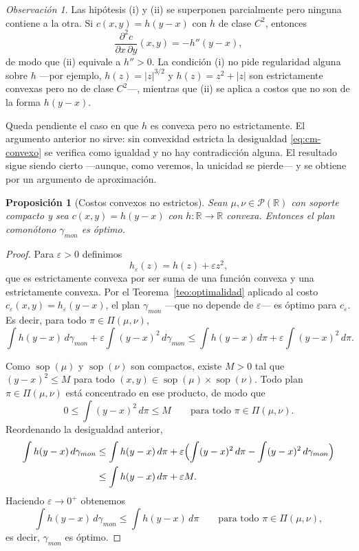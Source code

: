 \documentclass[12pt, a4paper]{amsbook}
\def\sop{\operatorname {\mathrm{sop}}}
\newcommand{\R}{{\mathbb R}}
\newtheorem{prop}[teo]{Proposición}
\theoremstyle{remark}
\newtheorem{obs}[teo]{Observación}
\theoremstyle{definition}
\numberwithin{section}{chapter}
\numberwithin{subsection}{section}
\numberwithin{equation}{section}
\numberwithin{figure}{chapter}
\begin{document}
\begin{obs}
Las hipótesis (i) y (ii) se superponen parcialmente pero ninguna contiene a la otra.
Si $c(x,y)=h(y-x)$ con $h$ de clase $C^2$, entonces
\[
\frac{\partial^2c}{\partial x\,\partial y}(x,y)=-h''(y-x),
\]
de modo que (ii) equivale a $h''>0$. La condición (i) no pide regularidad alguna
sobre $h$ —por ejemplo, $h(z)=|z|^{3/2}$ y $h(z)=z^2+|z|$ son estrictamente convexas
pero no de clase $C^2$—, mientras que (ii) se aplica a costos que no son de la forma
$h(y-x)$.
\end{obs}

Queda pendiente el caso en que $h$ es convexa pero no estrictamente. El argumento
anterior no sirve: sin convexidad estricta la desigualdad \eqref{eq:cm-convexo} se
verifica como igualdad y no hay contradicción alguna. El resultado sigue siendo
cierto —aunque, como veremos, la unicidad se pierde— y se obtiene por un argumento
de aproximación.

\begin{prop}[Costos convexos no estrictos]\label{prop:convexo-no-estricto}
Sean $\mu,\nu\in\mathcal P(\R)$ con soporte compacto y sea $c(x,y)=h(y-x)$ con
$h\colon\R\to\R$ convexa. Entonces el plan comonótono $\gamma_{mon}$ es óptimo.
\end{prop}
\begin{proof}
Para $\varepsilon>0$ definimos
\[
h_\varepsilon(z)=h(z)+\varepsilon z^2,
\]
que es estrictamente convexa por ser suma de una función convexa y una estrictamente
convexa. Por el Teorema~\ref{teo:optimalidad} aplicado al costo
$c_\varepsilon(x,y)=h_\varepsilon(y-x)$, el plan $\gamma_{mon}$ —que no depende de
$\varepsilon$— es óptimo para $c_\varepsilon$. Es decir, para todo
$\pi\in\Pi(\mu,\nu)$,
\[
\int h(y-x)\,d\gamma_{mon}+\varepsilon\int(y-x)^2\,d\gamma_{mon}
\le
\int h(y-x)\,d\pi+\varepsilon\int(y-x)^2\,d\pi.
\]

Como $\sop(\mu)$ y $\sop(\nu)$ son compactos, existe $M>0$ tal que $(y-x)^2\le M$
para todo $(x,y)\in\sop(\mu)\times\sop(\nu)$. Todo plan $\pi\in\Pi(\mu,\nu)$ está
concentrado en ese producto, de modo que
\[
0\le\int(y-x)^2\,d\pi\le M
\qquad\text{para todo }\pi\in\Pi(\mu,\nu).
\]
Reordenando la desigualdad anterior,
\[
\begin{aligned}
\int h(y-x)\,d\gamma_{mon}
&\le\int h(y-x)\,d\pi
+\varepsilon\Bigl(\int(y-x)^2\,d\pi-\int(y-x)^2\,d\gamma_{mon}\Bigr)\\
&\le\int h(y-x)\,d\pi+\varepsilon M.
\end{aligned}
\]
Haciendo $\varepsilon\to0^+$ obtenemos
\[
\int h(y-x)\,d\gamma_{mon}\le\int h(y-x)\,d\pi
\qquad\text{para todo }\pi\in\Pi(\mu,\nu),
\]
es decir, $\gamma_{mon}$ es óptimo.
\end{proof}
\end{document}
